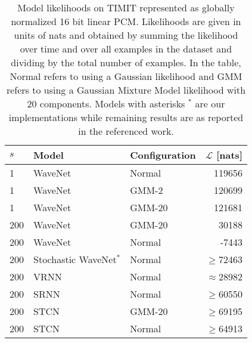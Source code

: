 {\begin{table}[t!]
    \caption{
    Model likelihoods on TIMIT represented as globally normalized 16 bit linear PCM. Likelihoods are given in units of nats and obtained by summing the likelihood over time and over all examples in the dataset and dividing by the total number of examples. In the table, Normal refers to using a Gaussian likelihood and GMM refers to using a  Gaussian Mixture Model likelihood with 20 components. Models with asterisks $^*$ are our implementations while remaining results are as reported in the referenced work.
    }
    \centering
    \begin{tabular}{lll|r}
        \toprule
        $s$ & \bf Model           & \bf Configuration           & \bf $\mathcal{L}$ [nats] \\
        \midrule
        1 & WaveNet                                                               & Normal & 119656 \\
        1 & WaveNet                                                               & GMM-2  & 120699 \\
        1 & WaveNet                                                               & GMM-20 & 121681 \\
        \midrule
        200 & WaveNet {\scriptsize \cite{aksan_stcn_2019}}                        & GMM-20    & 30188 \\
        200 & WaveNet {\scriptsize \cite{aksan_stcn_2019}}                        & Normal & -7443 \\
        200 & Stochastic WaveNet$^*$ {\scriptsize \cite{lai_stochastic_2018}}     & Normal & $\geq$72463\\
        200 & VRNN {\scriptsize \cite{chung_recurrent_2015}}                      & Normal & $\approx$28982\\
        200 & SRNN {\scriptsize \cite{fraccaro_sequential_2016}}                  & Normal & $\geq$60550 \\
        200 & STCN {\scriptsize \cite{aksan_stcn_2019}}                           & GMM-20 & $\geq$69195\\
        200 & STCN {\scriptsize \cite{aksan_stcn_2019}}                           & Normal & $\geq$64913\\

\end{tabular}
\end{table}}
